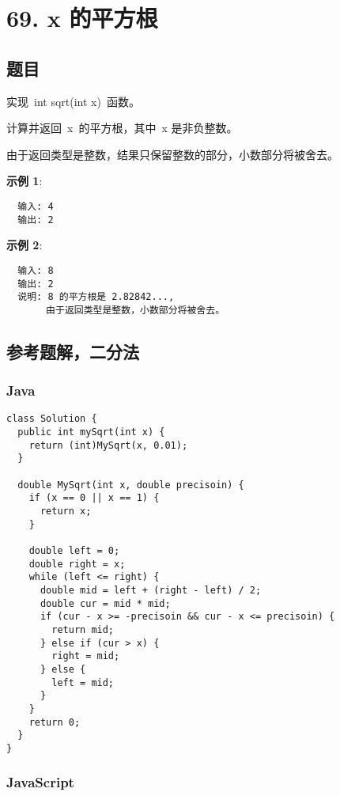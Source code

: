 \newpage
\section{69. x 的平方根}
\label{leetcode:69}

\subsection{题目}

实现 int sqrt(int x) 函数。

计算并返回 x 的平方根，其中 x 是非负整数。

由于返回类型是整数，结果只保留整数的部分，小数部分将被舍去。

\textbf{示例 1}:

\begin{verbatim}
  输入: 4
  输出: 2
\end{verbatim}

\textbf{示例 2}:

\begin{verbatim}
  输入: 8
  输出: 2
  说明: 8 的平方根是 2.82842...,
       由于返回类型是整数，小数部分将被舍去。
\end{verbatim}

\subsection{参考题解，二分法}

\subsubsection{Java}

\begin{verbatim}
class Solution {
  public int mySqrt(int x) {
    return (int)MySqrt(x, 0.01);
  }

  double MySqrt(int x, double precisoin) {
    if (x == 0 || x == 1) {
      return x;
    }

    double left = 0;
    double right = x;
    while (left <= right) {
      double mid = left + (right - left) / 2;
      double cur = mid * mid;
      if (cur - x >= -precisoin && cur - x <= precisoin) {
        return mid;
      } else if (cur > x) {
        right = mid;
      } else {
        left = mid;
      }
    }
    return 0;
  }
}
\end{verbatim}

\subsubsection{JavaScript}

